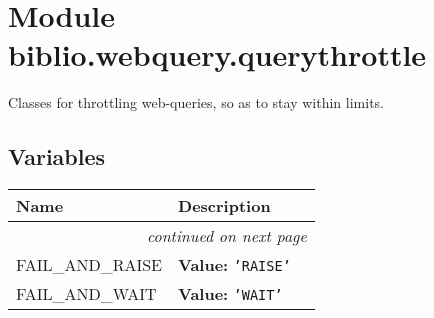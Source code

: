 %
%
%


\section{Module biblio.webquery.querythrottle}

    \label{biblio:webquery:querythrottle}

Classes for throttling web-queries, so as to stay within limits.


  \subsection{Variables}

    \vspace{-1cm}
\hspace{\varindent}\begin{longtable}{|p{\varnamewidth}|p{\vardescrwidth}|l}
\cline{1-2}
\cline{1-2} \centering \textbf{Name} & \centering \textbf{Description}& \\
\cline{1-2}
\endhead\cline{1-2}\multicolumn{3}{r}{\small\textit{continued on next page}}\\\endfoot\cline{1-2}
\endlastfoot\raggedright F\-A\-I\-L\-\_\-A\-N\-D\-\_\-R\-A\-I\-S\-E\- & \raggedright \textbf{Value:} 
{\tt \texttt{'}\texttt{RAISE}\texttt{'}}&\\
\cline{1-2}
\raggedright F\-A\-I\-L\-\_\-A\-N\-D\-\_\-W\-A\-I\-T\- & \raggedright \textbf{Value:} 
{\tt \texttt{'}\texttt{WAIT}\texttt{'}}&\\
\cline{1-2}
\end{longtable}



